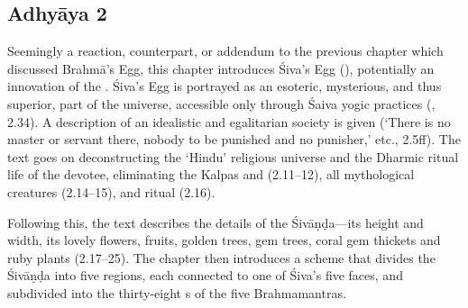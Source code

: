 %

 
\subsection{Adhyāya 2}\label{contents_of_ch02}
Seemingly a reaction, counterpart, or addendum to the previous chapter which
discussed Brahmā's Egg, this chapter introduces Śiva's Egg (),
potentially an innovation of the \VSS. Śiva's Egg is portrayed as an esoteric, mysterious, and
thus superior, part of the universe, accessible only through 
Śaiva yogic practices (, 2.34). A description of
an idealistic and egalitarian society is given (`There is no master or servant there, 
nobody to be punished and no punisher,' etc., 2.5ff). The text goes on 
deconstructing the `Hindu' religious universe and the Dharmic ritual 
life of the devotee, eliminating the Kalpas and  (2.11--12), 
all mythological creatures (2.14--15), and ritual (2.16).

Following this, the text describes the details of the Śivāṇḍa---its 
height and width, its lovely flowers, fruits, golden trees, 
gem trees, coral gem thickets and ruby plants (2.17--25). 
The chapter then introduces a scheme that divides the Śivāṇḍa 
into five regions, each connected to one of Śiva's five faces, and
subdivided into the thirty-eight s of the five Brahmamantras.

